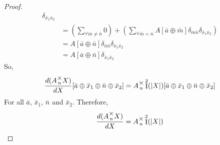 \documentclass[12pt]{book}
\theoremstyle{plain}
\theoremstyle{definition}
\theoremstyle{ppart}
\theoremstyle{case}
\theoremstyle{solution}
\DeclareMathOperator{\Ident}{I}
\newcommand{\mmult}[1]{\text{\raisebox{1ex}{$\underset{#1}{\times}$}}}
\newcommand{\shape}[1]{\left|#1\right|}
\begin{document}
\begin{proof}
\begin{align*}
  \delta_{\bar{x}_1 \bar{x}_2} \\
  &=
  \left(
    \sum_{\forall \bar{m} \ne \bar{n}} 0
  \right)
  +
  \left(
    \sum_{\forall \bar{m} = \bar{n}}
    A[\bar{a} \oplus \bar{m}]
    \delta_{\bar{m} \bar{n}}
    \delta_{\bar{x}_1 \bar{x}_2}
  \right) \\
  &=
  A[\bar{a} \oplus \bar{n}]
  \delta_{\bar{n} \bar{n}}
  \delta_{\bar{x}_1 \bar{x}_2} \\
  &=
  A[\bar{a} \oplus \bar{n}]
  \delta_{\bar{x}_1 \bar{x}_2}
\end{align*}
So, 
\[
  \frac{d(A\mmult{n}X)}{dX}[\bar{a} \oplus \bar{x}_1 \oplus \bar{n} \oplus \bar{x}_2]
  =
  A \mmult{n} \Ident^2(\shape{X})[\bar{a} \oplus \bar{x}_1 \oplus \bar{n} \oplus \bar{x}_2]
\]
For all $\bar{a}$, $\bar{x}_1$, $\bar{n}$ and $\bar{x}_2$. Therefore,
\[
  \frac{d(A\mmult{n}X)}{dX}
  =
  A \mmult{n} \Ident^2(\shape{X})
\]
\end{proof}
\end{document}
